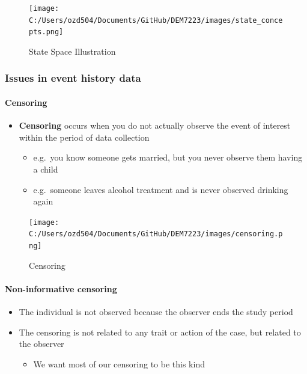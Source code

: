 \documentclass[
]{article}
\providecommand{\tightlist}{%
  \setlength{\itemsep}{0pt}\setlength{\parskip}{0pt}}
\begin{document}
\begin{figure}
\centering
\texttt{[image: C:/Users/ozd504/Documents/GitHub/DEM7223/images/state\_concepts.png]}
\caption{State Space Illustration}
\end{figure}

\hypertarget{issues-in-event-history-data}{%
\subsubsection{Issues in event history data}\label{issues-in-event-history-data}}

\hypertarget{censoring}{%
\paragraph{Censoring}\label{censoring}}

\begin{itemize}
\tightlist
\item
  \textbf{Censoring} occurs when you do not actually observe the event of interest within the period of data collection

  \begin{itemize}
  \tightlist
  \item
    e.g.~you know someone gets married, but you never observe them having a child
  \item
    e.g.~someone leaves alcohol treatment and is never observed drinking again
  \end{itemize}
\end{itemize}

\begin{figure}
\centering
\texttt{[image: C:/Users/ozd504/Documents/GitHub/DEM7223/images/censoring.png]}
\caption{Censoring}
\end{figure}

\hypertarget{non-informative-censoring}{%
\paragraph{Non-informative censoring}\label{non-informative-censoring}}

\begin{itemize}
\tightlist
\item
  The individual is not observed because the observer ends the study period
\item
  The censoring is not related to any trait or action of the case, but related to the observer

  \begin{itemize}
  \tightlist
  \item
    We want most of our censoring to be this kind
  \end{itemize}
\end{itemize}
\end{document}
